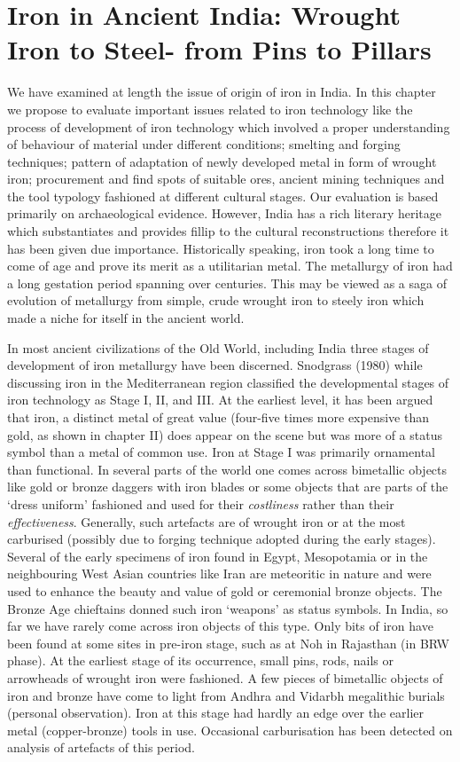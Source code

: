 
\chapter{Iron in Ancient India: Wrought Iron to Steel- from Pins to Pillars}\label{chapter4}

We have examined at length the issue of origin of iron in India. In this chapter we propose to evaluate important issues related to iron technology like the process of development of iron technology which involved a proper understanding of behaviour of material under different conditions; smelting and forging techniques; pattern of adaptation of newly developed metal in form of wrought iron; procurement and find spots of suitable ores, ancient mining techniques and the tool typology fashioned at different cultural stages. Our evaluation is based primarily on archaeological evidence. However, India has a rich literary heritage which substantiates and provides fillip to the cultural reconstructions therefore it has been given due importance. Historically speaking, iron took a long time to come of age and prove its merit as a utilitarian metal. The metallurgy of iron had a long gestation period spanning over centuries. This may be viewed as a saga of evolution of metallurgy from simple, crude wrought iron to steely iron which made a niche for itself in the ancient world.

In most ancient civilizations of the Old World, including India three stages of development of iron metallurgy have been discerned. Snodgrass (1980) while discussing iron in the Mediterranean region classified the developmental stages of iron technology as Stage I, II, and III. At the earliest level, it has been argued that iron, a distinct metal of great value (four-five times more expensive than gold, as shown in chapter II) does appear on the scene but was more of a status symbol than a metal of common use. Iron at Stage I was primarily ornamental than functional. In several parts of the world one comes across bimetallic objects like gold or bronze daggers with iron blades or some objects that are parts of the ‘dress uniform’ fashioned and used for their \textit{costliness} rather than their \textit{effectiveness}. Generally, such artefacts are of wrought iron or at the most carburised (possibly due to forging technique adopted during the early stages). Several of the early specimens of iron found in Egypt, Mesopotamia or in the neighbouring West Asian countries like Iran are meteoritic in nature and were used to enhance the beauty and value of gold or ceremonial bronze objects. The Bronze Age chieftains donned such iron ‘weapons’ as status symbols. In India, so far we have rarely come across iron objects of this type. Only bits of iron have been found at some sites in pre-iron stage, such as at Noh in Rajasthan (in BRW phase). At the earliest stage of its occurrence, small pins, rods, nails or arrowheads of wrought iron were fashioned. A few pieces of bimetallic objects of iron and bronze have come to light from Andhra and Vidarbh megalithic burials (personal observation). Iron at this stage had hardly an edge over the earlier metal (copper-bronze) tools in use. Occasional carburisation has been detected on analysis of artefacts of this period.

